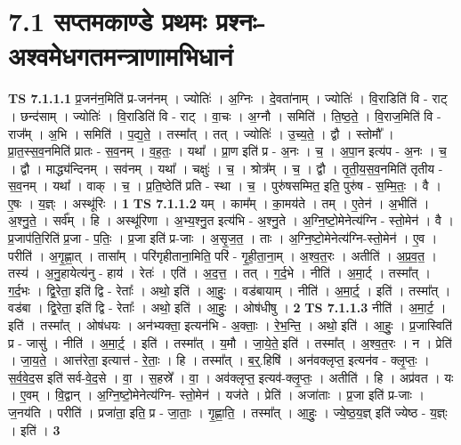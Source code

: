 \documentclass[17pt]{extarticle}
\begin{document}
\section*{ 7.1      सप्तमकाण्डे प्रथमः प्रश्नः- अश्वमेधगतमन्त्राणामभिधानं }
                                \textbf{ TS 7.1.1.1} \newline
                  प्र॒जन॑न॒मिति॑ प्र-जन॑नम् । ज्योतिः॑ । अ॒ग्निः । दे॒वता॑नाम् । ज्योतिः॑ । वि॒राडिति॑ वि - राट् । छन्द॑साम् । ज्योतिः॑ । वि॒राडिति॑ वि - राट् । वा॒चः । अ॒ग्नौ । समिति॑ । ति॒ष्ठ॒ते॒ । वि॒राज॒मिति॑ वि - राज᳚म् । अ॒भि । समिति॑ । प॒द्य॒ते॒ । तस्मा᳚त् । तत् । ज्योतिः॑ । उ॒च्य॒ते॒ । द्वौ । स्तोमौ᳚ । प्रा॒त॒स्स॒व॒नमिति॑ प्रातः - स॒व॒नम् । व॒ह॒तः॒ । यथा᳚ । प्रा॒ण इति॑ प्र - अ॒नः । च॒ । अ॒पा॒न इत्य॑प - अ॒नः । च॒ । द्वौ । माद्ध्य॑न्दिनम् । सव॑नम् । यथा᳚ । चक्षुः॑ । च॒ । श्रोत्र᳚म् । च॒ । द्वौ । तृ॒ती॒य॒स॒व॒नमिति॑ तृतीय - स॒व॒नम् । यथा᳚ । वाक् । च॒ । प्र॒ति॒ष्ठेति॑ प्रति - स्था । च॒ । पुरु॑षसम्मित॒ इति॒ पुरु॑ष - स॒म्मि॒तः॒ । वै । ए॒षः । य॒ज्ञ्ः । अस्थू॑रिः । \textbf{  1} \newline
                  \newline
                                \textbf{ TS 7.1.1.2} \newline
                  यम् । काम᳚म् । का॒मय॑ते । तम् । ए॒तेन॑ । अ॒भीति॑ । अ॒श्नु॒ते॒ । सर्व᳚म् । हि । अस्थू॑रिणा । अ॒भ्य॒श्नु॒त इत्य॑भि - अ॒श्नु॒ते । अ॒ग्नि॒ष्टो॒मेनेत्य॑ग्नि - स्तो॒मेन॑ । वै । प्र॒जाप॑ति॒रिति॑ प्र॒जा - प॒तिः॒ । प्र॒जा इति॑ प्र-जाः । अ॒सृ॒ज॒त॒ । ताः । अ॒ग्नि॒ष्टो॒मेनेत्य॑ग्नि-स्तो॒मेन॑ । ए॒व । परीति॑ । अ॒गृ॒ह्णा॒त् । तासा᳚म् । परि॑गृहीताना॒मिति॒ परि॑ - गृ॒ही॒ता॒ना॒म् । अ॒श्व॒त॒रः । अतीति॑ । अ॒प्र॒व॒त॒ । तस्य॑ । अ॒नु॒हायेत्य॑नु - हाय॑ । रेतः॑ । एति॑ । अ॒द॒त्त॒ । तत् । ग॒र्द॒भे । नीति॑ । अ॒मा॒र्ट् । तस्मा᳚त् । ग॒र्द॒भः । द्वि॒रेता॒ इति॑ द्वि - रेताः᳚ । अथो॒ इति॑ । आ॒हुः॒ । वड॑बायाम् । नीति॑ । अ॒मा॒र्ट्॒ । इति॑ । तस्मा᳚त् । वड॑बा । द्वि॒रेता॒ इति॑ द्वि - रेताः᳚ । अथो॒ इति॑ । आ॒हुः॒ । ओष॑धीषु । \textbf{  2} \newline
                  \newline
                                \textbf{ TS 7.1.1.3} \newline
                  नीति॑ । अ॒मा॒र्ट॒ । इति॑ । तस्मा᳚त् । ओष॑धयः । अन॑भ्यक्ता॒ इत्यन॑भि - अ॒क्ताः॒ । रे॒भ॒न्ति॒ । अथो॒ इति॑ । आ॒हुः॒ । प्र॒जास्विति॑ प्र - जासु॑ । नीति॑ । अ॒मा॒र्ट्॒ । इति॑ । तस्मा᳚त् । य॒मौ । जा॒ये॒ते॒ इति॑ । तस्मा᳚त् । अ॒श्व॒त॒रः । न । प्रेति॑ । जा॒य॒ते॒ । आत्त॑रेता॒ इत्यात्त॑ - रे॒ताः॒ । हि । तस्मा᳚त् । ब॒र्॒.हिषि॑ । अन॑वक्लृप्त॒ इत्यन॑व - क्लृ॒प्तः॒ । स॒र्व॒वे॒द॒स इति॑ सर्व-वे॒द॒से । वा॒ । स॒हस्रे᳚ । वा॒ । अव॑क्लृप्त॒ इत्यव॑-क्लृ॒प्तः॒ । अतीति॑ । हि । अप्र॑वत । यः । ए॒वम् । वि॒द्वान् । अ॒ग्नि॒ष्टो॒मेनेत्य॑ग्नि- स्तो॒मेन॑ । यज॑ते । प्रेति॑ । अजा॑ताः । प्र॒जा इति॑ प्र-जाः । ज॒नय॑ति । परीति॑ । प्रजा॑ता॒ इति॒ प्र - जा॒ताः॒ । गृ॒ह्णा॒ति॒ । तस्मा᳚त् । आ॒हुः॒ । ज्ये॒ष्ठ॒य॒ज्ञ् इति॑ ज्येष्ठ - य॒ज्ञ्ः । इति॑ । \textbf{  3} \newline
\end{document}
